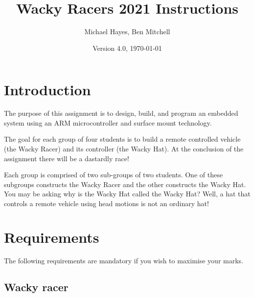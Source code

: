 \documentclass[11pt, a4paper]{article}
\title{Wacky Racers 2021 Instructions}
\author{Michael Hayes, Ben Mitchell}
\date{Version 4.0, \today}
\begin{document}
\maketitle

\section{Introduction}

The purpose of this assignment is to design, build, and program an
embedded system using an ARM microcontroller and surface mount
technology.

The goal for each group of four students is to build a remote
controlled vehicle (the Wacky Racer) and its controller (the Wacky
Hat).  At the conclusion of the assignment there will be a dastardly race!

Each group is comprised of two sub-groups of two students.  One of
these subgroups constructs the Wacky Racer and the other constructs
the Wacky Hat.  You may be asking why is the Wacky Hat called the
Wacky Hat?  Well, a hat that controls a remote vehicle using head
motions is not an ordinary hat!


\section{Requirements}

The following requirements are mandatory if you wish to maximise your
marks.


\subsection{Wacky racer}
\end{document}
